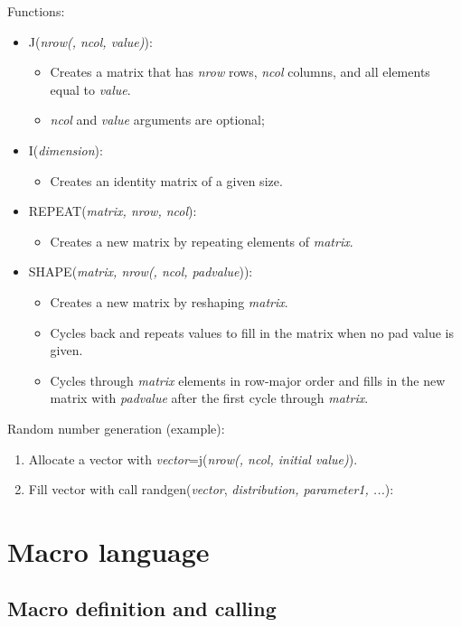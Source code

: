 \documentclass[11pt, oneside]{article}
\begin{document}
Functions:
\begin{itemize}
\item J(\textit{nrow(, ncol, value)}):
	\begin{itemize}
	\item Creates a matrix that has \textit{nrow} rows, \textit{ncol} columns, and all elements equal to \textit{value}.
	\item \textit{ncol} and \textit{value} arguments are optional;
	\end{itemize}
\item I(\textit{dimension}):
	\begin{itemize}
	\item Creates an identity matrix of a given size.
	\end{itemize}
\item REPEAT(\textit{matrix, nrow, ncol}):
	\begin{itemize}
	\item Creates a new matrix by repeating elements of \textit{matrix}.
	\end{itemize}
\item SHAPE(\textit{matrix, nrow(, ncol, padvalue})):
	\begin{itemize}
	\item Creates a new matrix by reshaping \textit{matrix}.
	\item Cycles back and repeats values to fill in the matrix when no pad value is given.
	\item Cycles through \textit{matrix} elements in row-major order and fills in the new matrix with \textit{padvalue} after the first cycle through \textit{matrix}.
	\end{itemize}
\end{itemize}

Random number generation (example):
\begin{enumerate}
\item Allocate a vector with \textit{vector}=j(\textit{nrow(, ncol, initial value)}).
\item Fill vector with call randgen(\textit{vector}, \textit{distribution, parameter1, ...}): 
\end{enumerate}

\section{Macro language}

\subsection{Macro definition and calling}
\end{document}
